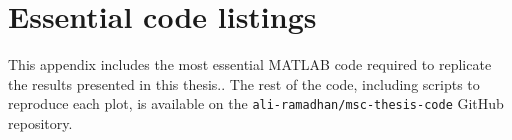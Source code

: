 \chapter{Essential code listings} \label{appx:code}

This appendix includes the most essential MATLAB code required to replicate the results presented in this thesis.. The rest of the code, including scripts to reproduce each plot, is available on the \texttt{ali-ramadhan/msc-thesis-code} GitHub repository.


\inputminted{matlab}{CodeListings/hamiltonianDerivative.m}
\inputminted{matlab}{CodeListings/simulateMomenta.m}
\inputminted{matlab}{CodeListings/removeCOMMotion.m}
\inputminted{matlab}{CodeListings/rotateMomentum.m}
\inputminted{matlab}{CodeListings/lookupGeometries.m}
\inputminted{matlab}{CodeListings/multiStartTriatomic.m}